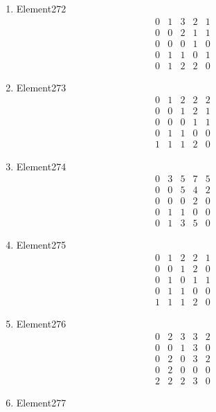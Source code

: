 \documentclass[12pt]{article}
\begin{document}
\begin{multicols}{3}
\begin{enumerate}
\item Element272
\begin{equation*}
\begin{array}{ccccc}
0&1&3&2&1\\
0&0&2&1&1\\
0&0&0&1&0\\
0&1&1&0&1\\
0&1&2&2&0
\end{array}
\end{equation*}
\item Element273
\begin{equation*}
\begin{array}{ccccc}
0&1&2&2&2\\
0&0&1&2&1\\
0&0&0&1&1\\
0&1&1&0&0\\
1&1&1&2&0
\end{array}
\end{equation*}
\item Element274
\begin{equation*}
\begin{array}{ccccc}
0&3&5&7&5\\
0&0&5&4&2\\
0&0&0&2&0\\
0&1&1&0&0\\
0&1&3&5&0
\end{array}
\end{equation*}
\item Element275
\begin{equation*}
\begin{array}{ccccc}
0&1&2&2&1\\
0&0&1&2&0\\
0&1&0&1&1\\
0&1&1&0&0\\
1&1&1&2&0
\end{array}
\end{equation*}
\item Element276
\begin{equation*}
\begin{array}{ccccc}
0&2&3&3&2\\
0&0&1&3&0\\
0&2&0&3&2\\
0&2&0&0&0\\
2&2&2&3&0
\end{array}
\end{equation*}
\item Element277
\begin{equation*}

\end{equation*}
\end{enumerate}
\end{multicols}
\end{document}
